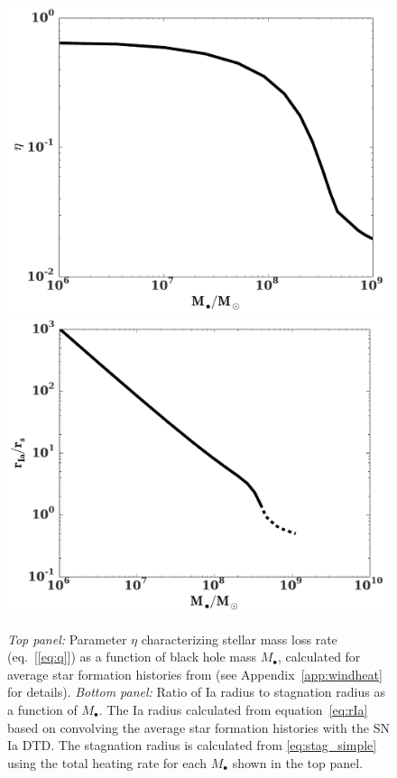 \documentclass[usenatbib,fleqn]{mn2e}
\newcommand{\Mbh}[1][]{M_{\bullet#1}}
\begin{document}
\begin{figure}
\includegraphics[width=\columnwidth]{eta.pdf}
\includegraphics[width=\columnwidth]{rs_rIa.pdf}
\caption{\label{fig:eta} {\it Top panel:} Parameter $\eta$ characterizing stellar mass
  loss rate (eq.~[\ref{eq:q}]) as a function of black hole mass
  $\Mbh$, calculated for average star formation histories from
  \citet{MosterNaab+:2013a} (see Appendix~\ref{app:windheat} for details).  {\it Bottom panel:} Ratio of Ia radius to stagnation radius as a function of $\Mbh$.  The Ia radius calculated from equation~\eqref{eq:rIa} based on convolving the average star formation histories with the SN Ia DTD.  The stagnation radius is calculated from \eqref{eq:stag_simple} using the total heating rate for each $\Mbh$ shown in the top panel. }
\end{figure}
\end{document}
